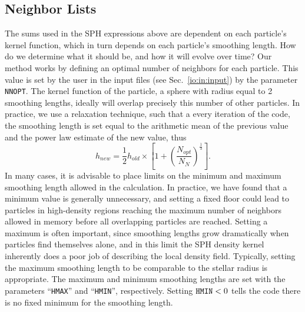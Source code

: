 \subsection{Neighbor Lists}
\label{nm:nl}
The sums used in the SPH expressions above are dependent on each particle's
kernel function, which in turn depends on each particle's smoothing
length.  How do we determine what it should be, and how it will evolve
over time?  Our method works by defining an optimal number of
neighbors for each particle.  This value is set by the user in the
input files (see Sec.~\ref{io:in:input}) by the parameter {\tt NNOPT}.
The kernel function of the particle, a
sphere with radius equal to 2 smoothing lengths, ideally will overlap
precisely this number of other particles.  In practice, we use a
relaxation technique, such that a every iteration of the code, the
smoothing length is set equal to the arithmetic mean of the previous
value and the power law estimate of the new value, thus
\begin{equation}
h_{new}=\frac{1}{2}h_{old}\times
\left[1+\left(\frac{N_{opt}}{N_N}\right)^{\frac{1}{3}}\right].\label{eq:hpnew} 
\end{equation}
In many cases, it is advisable to place limits on the minimum and
maximum smoothing length allowed in the calculation.  In practice, we
have found that a minimum value is generally unnecessary, and setting
a fixed floor could lead to particles in high-density regions reaching
the maximum number of neighbors allowed in memory before all
overlapping particles are reached.  Setting a maximum is often
important, since smoothing lengths grow dramatically when particles
find themselves alone, and in this limit the SPH density kernel
inherently does a poor job of describing the local density field.
Typically, setting the maximum smoothing length to be comparable to the
stellar radius is appropriate.  The maximum and minimum smoothing
lengths are set with the parameters ``{\tt HMAX}'' and ``{\tt HMIN}'',
respectively.  Setting ${\tt HMIN}<0$ tells the code there is no fixed
minimum for the smoothing length. 

